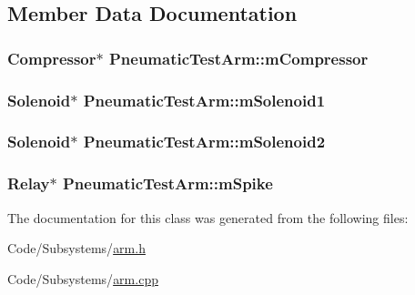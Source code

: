 \subsection{\-Member \-Data \-Documentation}
\hypertarget{class_pneumatic_test_arm_a8a175af4d48bf840a49b37e9ef0da697}{
\subsubsection[{m\-Compressor}]{\setlength{\rightskip}{0pt plus 5cm}\-Compressor$\ast$ {\bf \-Pneumatic\-Test\-Arm\-::m\-Compressor}}}\label{class_pneumatic_test_arm_a8a175af4d48bf840a49b37e9ef0da697}
\hypertarget{class_pneumatic_test_arm_a16bb555ce804d5a0b1d587472e5fb523}{
\subsubsection[{m\-Solenoid1}]{\setlength{\rightskip}{0pt plus 5cm}\-Solenoid$\ast$ {\bf \-Pneumatic\-Test\-Arm\-::m\-Solenoid1}}}\label{class_pneumatic_test_arm_a16bb555ce804d5a0b1d587472e5fb523}
\hypertarget{class_pneumatic_test_arm_a7d627d50dc4f17a7e76bd253b69ff1cc}{
\subsubsection[{m\-Solenoid2}]{\setlength{\rightskip}{0pt plus 5cm}\-Solenoid$\ast$ {\bf \-Pneumatic\-Test\-Arm\-::m\-Solenoid2}}}\label{class_pneumatic_test_arm_a7d627d50dc4f17a7e76bd253b69ff1cc}
\hypertarget{class_pneumatic_test_arm_aa7ac2676bd9c7a596698813c6be32250}{
\subsubsection[{m\-Spike}]{\setlength{\rightskip}{0pt plus 5cm}\-Relay$\ast$ {\bf \-Pneumatic\-Test\-Arm\-::m\-Spike}}}\label{class_pneumatic_test_arm_aa7ac2676bd9c7a596698813c6be32250}


\-The documentation for this class was generated from the following files\-:\begin{DoxyCompactItemize}
\item 
\-Code/\-Subsystems/\hyperlink{arm_8h}{arm.\-h}\item 
\-Code/\-Subsystems/\hyperlink{arm_8cpp}{arm.\-cpp}\end{DoxyCompactItemize}
